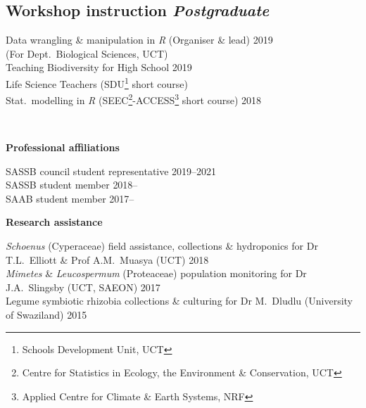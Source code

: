 \documentclass[10pt]{article}
\begin{document}
\begin{multicols}{2}
\subsection*{Workshop instruction %
                                 \hfill {\small \textmd{\textit{Postgraduate}}}}

Data wrangling \& manipulation in \textit{R} {\small (Organiser \& lead)}                       \hfill {\small             2019} \\
  \hspace{2em} {\small (For Dept.~Biological Sciences, UCT)} \\
Teaching Biodiversity for High School        \hfill {\small             2019}                                 \\
  \hspace{2em} Life Science Teachers {\small
  (SDU\footnote{Schools Development Unit,
  UCT} short course)}                         \\
Stat.~modelling in \textit{R} {\small
  (SEEC\footnote{Centre for Statistics in
  Ecology, the Environment \&
  Conservation, UCT}-ACCESS\footnote{Applied
  Centre for Climate \& Earth Systems, NRF}
  short course)}                             \hfill {\small             2018}

\

\textbf{Professional affiliations} %

SASSB council student representative               \hfill {\small 2019--2021} \\
SASSB student member                               \hfill {\small 2018--    } \\
SAAB student member                                \hfill {\small 2017--    } \\

\end{multicols} %

\textbf{Research assistance} %

\textit{Schoenus} (Cyperaceae)
field assistance, collections \& hydroponics
for Dr T.L.~Elliott \& Prof A.M.~Muasya
{\small (UCT)}                                         \hfill {\small 2018} \\
\textit{Mimetes} \& \textit{Leucospermum} (Proteaceae)
population monitoring
for Dr J.A.~Slingsby
{\small (UCT, SAEON)}                                  \hfill {\small 2017} \\
Legume symbiotic rhizobia
collections \& culturing
for Dr M.~Dludlu
{\small (University of Swaziland)}                     \hfill {\small 2015}

\begin{multicols}{2} %

\end{multicols} %
\end{document}
